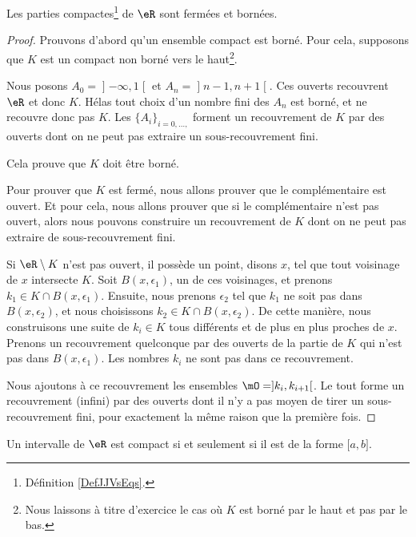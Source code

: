 \begin{proposition}     \label{PROPooBFSAooKSugMj}
	Les parties compactes\footnote{Définition \ref{DefJJVsEqs}.} de \( \eR\) sont fermées et bornées.
\end{proposition}

\begin{proof}
	Prouvons d'abord qu'un ensemble compact est borné. Pour cela, supposons que \( K\) est un compact non borné vers le haut\footnote{Nous laissons à titre d'exercice le cas où \( K\) est borné par le haut et pas par le bas.}. 

    Nous posons \( A_0=\mathopen] -\infty , 1 \mathclose[\) et \( A_n=\mathopen] n-1 , n+1 \mathclose[\). Ces ouverts recouvrent \( \eR\) et donc \( K\). Hélas tout choix d'un nombre fini des \( A_n\) est borné, et ne recouvre donc pas \( K\). Les \(  \{ A_i \}_{i=0,\ldots, }  \) forment un recouvrement de \( K\) par des ouverts dont on ne peut pas extraire un sous-recouvrement fini.

	Cela prouve que \( K\) doit être borné.

	Pour prouver que \( K\) est fermé, nous allons prouver que le complémentaire est ouvert. Et pour cela, nous allons prouver que si le complémentaire n'est pas ouvert, alors nous pouvons construire un recouvrement de \( K\) dont on ne peut pas extraire de sous-recouvrement fini.

	Si \( \eR\setminus K\) n'est pas ouvert, il possède un point, disons \( x\), tel que tout voisinage de \( x\) intersecte \( K\). Soit \( B(x,\epsilon_1)\), un de ces voisinages, et prenons \( k_1\in K\cap B(x,\epsilon_1)\). Ensuite, nous prenons \( \epsilon_2\) tel que \( k_1\) ne soit pas dans \( B(x,\epsilon_2)\), et nous choisissons \( k_2\in K\cap B(x,\epsilon_2)\). De cette manière, nous construisons une suite de \( k_i\in K\) tous différents et de plus en plus proches de \( x\). Prenons un recouvrement quelconque par des ouverts de la partie de \( K\) qui n'est pas dans \( B(x,\epsilon_1)\). Les nombres \( k_i\) ne sont pas dans ce recouvrement.

	Nous ajoutons à ce recouvrement les ensembles \( \mO=]k_i,k_{i+1}[\). Le tout forme un recouvrement (infini) par des ouverts dont il n'y a pas moyen de tirer un sous-recouvrement fini, pour exactement la même raison que la première fois.
\end{proof}

\begin{theorem}   \label{ThoBOrelLebesgue}
	Un intervalle de \( \eR\) est compact si et seulement si il est de la forme \( \mathopen[ a , b \mathclose]\).
\end{theorem}

